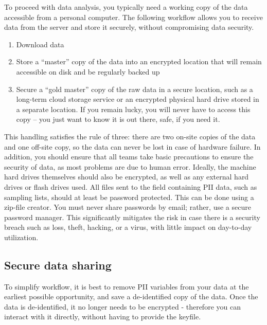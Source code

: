 {To proceed with data analysis, you typically need a working copy of the data accessible from a personal computer. The following workflow allows you to receive data from the server and store it securely, without compromising data security. 

\begin{enumerate}
	\item Download data
	\item Store a ``master'' copy of the data into an encrypted location that will remain accessible on disk and be regularly backed up
	\item Secure a ``gold master'' copy of the raw data in a secure location, such as a long-term cloud storage service or an encrypted physical hard drive stored in a separate location. If you remain lucky, you will never have to access this copy -- you just want to know it is out there, safe, if you need it.
	
\end{enumerate}

This handling satisfies the rule of three: there are two on-site copies of the data and one off-site copy, so the data can never be lost in case of hardware failure. 
In addition, you should ensure that all teams take basic precautions to ensure the security of data, as most problems are due to human error.
Ideally, the machine hard drives themselves should also be encrypted, as well as any external hard drives or flash drives used. 
All files sent to the field containing PII data, such as sampling lists, should at least be password protected. This can be done using a zip-file creator.
You must never share passwords by email; rather, use a secure password manager. 
This significantly mitigates the risk in case there is a security breach such as loss, theft, hacking, or a virus, with little impact on day-to-day utilization.

\subsection{Secure data sharing}
To simplify workflow, it is best to remove PII variables from your data at the earliest possible opportunity, and save a de-identified copy of the data. 
Once the data is de-identified, it no longer needs to be encrypted - therefore you can interact with it directly, without having to provide the keyfile. 

}
